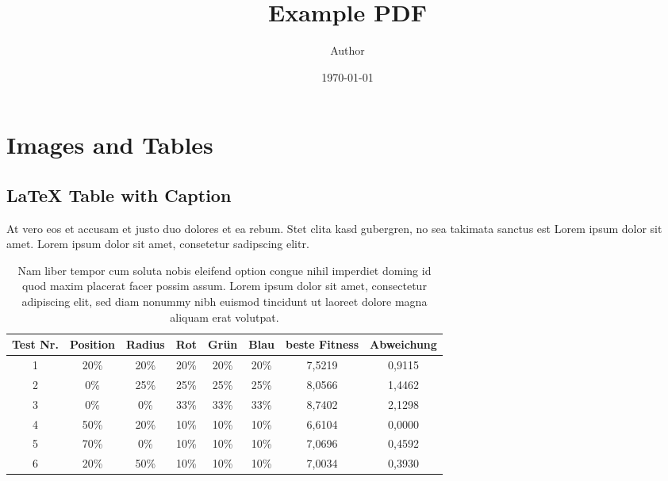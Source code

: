 \documentclass[11pt,a4paper]{article}
\title{Example PDF}
\author{Author}
\date{\today}
\begin{document}
\maketitle
\thispagestyle{fancy}

\tableofcontents
\newpage

\section{Images and Tables}

\subsection{LaTeX Table with Caption}

At vero eos et accusam et justo duo dolores et ea rebum. Stet clita kasd gubergren, no sea takimata sanctus est Lorem ipsum dolor sit amet. Lorem ipsum dolor sit amet, consetetur sadipscing elitr.

\begin{table}[H]
\centering
\caption{Nam liber tempor cum soluta nobis eleifend option congue nihil imperdiet doming id quod maxim placerat facer possim assum. Lorem ipsum dolor sit amet, consectetur adipiscing elit, sed diam nonummy nibh euismod tincidunt ut laoreet dolore magna aliquam erat volutpat.}
\label{tab:test_results}
\begin{tabular}{@{}cccccccc@{}}
\toprule
\textbf{Test Nr.} & \textbf{Position} & \textbf{Radius} & \textbf{Rot} & \textbf{Grün} & \textbf{Blau} & \textbf{beste Fitness} & \textbf{Abweichung} \\
\midrule
1 & 20\% & 20\% & 20\% & 20\% & 20\% & 7,5219 & 0,9115 \\
2 & 0\% & 25\% & 25\% & 25\% & 25\% & 8,0566 & 1,4462 \\
3 & 0\% & 0\% & 33\% & 33\% & 33\% & 8,7402 & 2,1298 \\
4 & 50\% & 20\% & 10\% & 10\% & 10\% & 6,6104 & 0,0000 \\
5 & 70\% & 0\% & 10\% & 10\% & 10\% & 7,0696 & 0,4592 \\
6 & 20\% & 50\% & 10\% & 10\% & 10\% & 7,0034 & 0,3930 \\
\bottomrule
\end{tabular}
\end{table}
\end{document}
